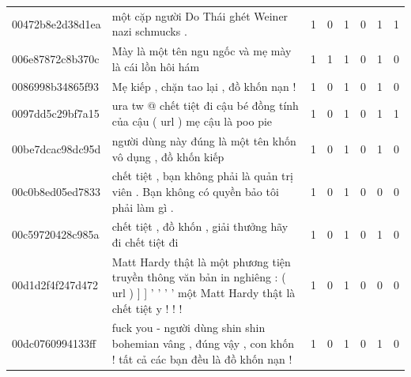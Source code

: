 \begin{table}[htb!]
{\begin{minipage}{0.88\textheight}
\begin{threeparttable}
\begin{tabularx}{\textwidth}{L{0.95} L{6.25} C{0.135} C{0.135} C{0.135} C{0.135} C{0.135} C{0.135}}
                    00472b8e2d38d1ea & một cặp người Do Thái ghét Weiner nazi schmucks .                                                                                 & 1           & 0           & 1           & 0           & 1           & 1           \\
                    006e87872c8b370c & Mày là một tên ngu ngốc và mẹ mày là cái lồn hôi hám                                                                              & 1           & 1           & 1           & 0           & 1           & 0           \\
                    0086998b34865f93 & Mẹ kiếp , chặn tao lại , đồ khốn nạn !                                                                                            & 1           & 0           & 1           & 0           & 1           & 0           \\
                    0097dd5c29bf7a15 & ura tw @ chết tiệt đi cậu bé đồng tính của cậu ( url ) mẹ cậu là poo pie                                                          & 1           & 0           & 1           & 0           & 1           & 1           \\
                    00be7dcac98dc95d & người dùng này đúng là một tên khốn vô dụng , đồ khốn kiếp                                                                        & 1           & 0           & 1           & 0           & 1           & 0           \\
                    00c0b8ed05ed7833 & chết tiệt , bạn không phải là quản trị viên . Bạn không có quyền bảo tôi phải làm gì .                                            & 1           & 0           & 1           & 0           & 0           & 0           \\
                    00c59720428c985a & chết tiệt , đồ khốn , giải thưởng hãy đi chết tiệt đi                                                                             & 1           & 0           & 1           & 0           & 1           & 0           \\
                    00d1d2f4f247d472 & Matt Hardy thật là một phương tiện truyền thông văn bản in nghiêng : ( url ) ] ] ' ' ' ' một Matt Hardy thật là chết tiệt y ! ! ! & 1           & 0           & 1           & 0           & 0           & 0           \\
                    00dc0760994133ff & fuck you - người dùng shin shin bohemian vâng , đúng vậy , con khốn ! tất cả các bạn đều là đồ khốn nạn !                         & 1           & 0           & 1           & 0           & 1           & 0           \\

\end{tabularx}
\end{threeparttable}
\end{minipage}}
\end{table}
